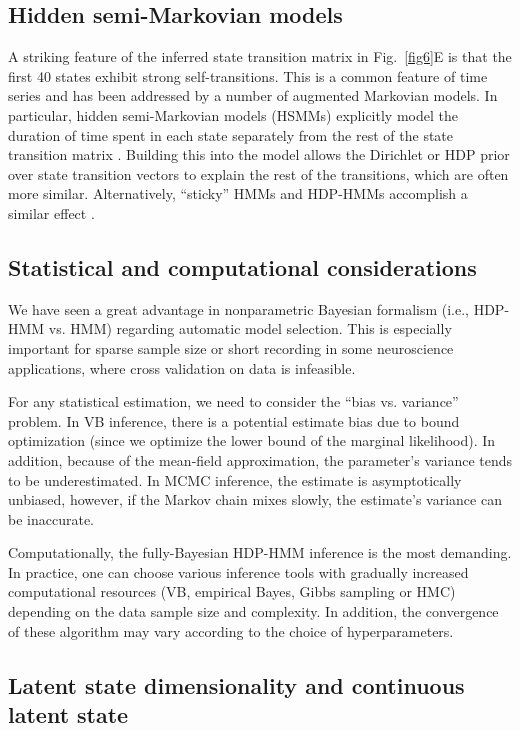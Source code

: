 \subsection{Hidden semi-Markovian models}
A striking feature of the inferred state transition matrix in
Fig.~\ref{fig6}E is that the first 40 states exhibit strong
self-transitions. This is a common feature of time series and has been
addressed by a number of augmented Markovian models. In particular,
hidden semi-Markovian models (HSMMs) explicitly model the duration of
time spent in each state separately from the rest of the state
transition matrix \citep{Johnson13}. Building this into the model
allows the Dirichlet or HDP prior over state transition vectors to
explain the rest of the transitions, which are often more
similar. Alternatively, ``sticky'' HMMs and HDP-HMMs accomplish a
similar effect \citep{Fox08}.

\subsection{Statistical and computational considerations}
We have seen a great advantage in nonparametric Bayesian formalism
(i.e., HDP-HMM vs. HMM) regarding automatic model selection. This is
especially important for sparse sample size or short recording in some
neuroscience applications, where cross validation on data is
infeasible.

For any statistical estimation, we need to consider the ``bias
vs. variance'' problem.  In VB inference, there is a potential
estimate bias due to bound optimization (since we optimize the lower
bound of the marginal likelihood). In addition, because of the
mean-field approximation, the parameter's variance tends to be
underestimated. In MCMC inference, the estimate is asymptotically
unbiased, however, if the Markov chain mixes slowly, the estimate's
variance can be inaccurate.

Computationally, the fully-Bayesian HDP-HMM inference is the most
demanding. In practice, one can choose various inference tools with
gradually increased computational resources (VB, empirical Bayes,
Gibbs sampling or HMC) depending on the data sample size and
complexity. In addition, the convergence of these algorithm may vary
according to the choice of hyperparameters.


\subsection{Latent state dimensionality and continuous latent state}

